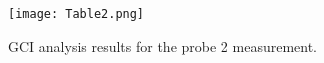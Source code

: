 \begin{figure}[H]
\centering     %
\texttt{[image: Table2.png]}
\caption{GCI analysis results for the probe 2 measurement.}
\end{figure}
